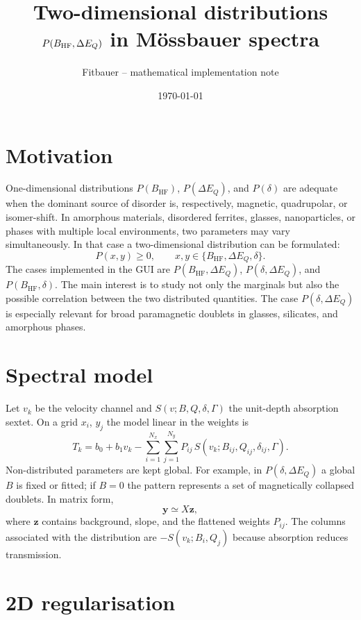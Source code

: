 \documentclass[11pt,a4paper]{article}
\title{Two-dimensional distributions $P(\BHF,\DEQ)$ in M\"{o}ssbauer spectra}
\author{Fitbauer -- mathematical implementation note}
\date{\today}
\newcommand{\BHF}{B_{\mathrm{HF}}}
\newcommand{\DEQ}{\Delta E_Q}
\begin{document}
\maketitle

\section{Motivation}

One-dimensional distributions $P(\BHF)$, $P(\DEQ)$, and $P(\delta)$ are
adequate when the dominant source of disorder is, respectively, magnetic,
quadrupolar, or isomer-shift. In amorphous materials, disordered ferrites,
glasses, nanoparticles, or phases with multiple local environments, two
parameters may vary simultaneously. In that case a two-dimensional distribution
can be formulated:
\begin{equation}
  P(x,y)\ge 0,\qquad x,y\in\{\BHF,\DEQ,\delta\}.
\end{equation}
The cases implemented in the GUI are $P(\BHF,\DEQ)$, $P(\delta,\DEQ)$, and
$P(\BHF,\delta)$. The main interest is to study not only the marginals but also
the possible correlation between the two distributed quantities. The case
$P(\delta,\DEQ)$ is especially relevant for broad paramagnetic doublets in
glasses, silicates, and amorphous phases.

\section{Spectral model}

Let $v_k$ be the velocity channel and $S(v;B,Q,\delta,\Gamma)$ the unit-depth
absorption sextet. On a grid $x_i$, $y_j$ the model linear in the weights is
\begin{equation}
  T_k = b_0 + b_1 v_k - \sum_{i=1}^{N_x}\sum_{j=1}^{N_y}
  P_{ij}\,S(v_k;B_{ij},Q_{ij},\delta_{ij},\Gamma).
\end{equation}
Non-distributed parameters are kept global. For example, in $P(\delta,\DEQ)$
a global $B$ is fixed or fitted; if $B=0$ the pattern represents a set of
magnetically collapsed doublets.
In matrix form,
\begin{equation}
  \bm y \simeq X\bm z,
\end{equation}
where $\bm z$ contains background, slope, and the flattened weights $P_{ij}$.
The columns associated with the distribution are $-S(v_k;B_i,Q_j)$ because
absorption reduces transmission.

\section{2D regularisation}
\end{document}
